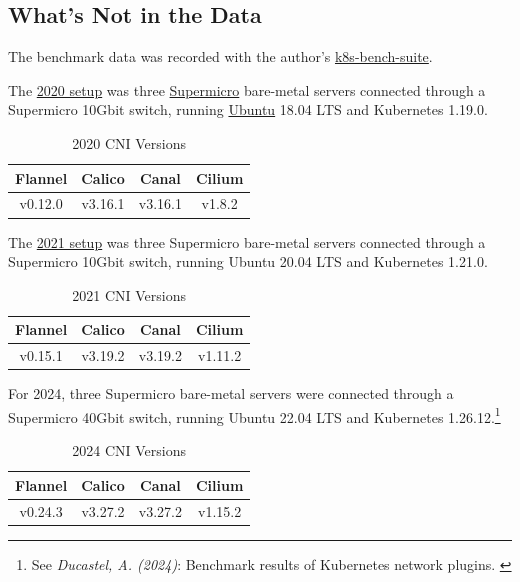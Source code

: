 \subsection{What's Not in the Data}

The benchmark data was recorded with the author's \href{https://github.com/InfraBuilder/k8s-bench-suite}{k8s-bench-suite}.

The \href{https://github.com/InfraBuilder/benchmark-k8s-cni-2020-08/blob/master/PROTOCOL.md}{2020 setup} was three \href{https://www.supermicro.com/en/}{Supermicro} bare-metal servers connected through a Supermicro 10Gbit switch, running \href{https://ubuntu.com/server}{Ubuntu} 18.04 LTS and Kubernetes 1.19.0.

\begin{table}[h!]
\caption{2020 CNI Versions}
\begin{tabular}{|c | c | c | c |} 
 \hline
 Flannel & Calico & Canal & Cilium \\
 \hline
 v0.12.0 & v3.16.1 & v3.16.1 & v1.8.2 \\ 
 \hline
\end{tabular}
\label{tab:2020ver}
\end{table}

The \href{https://github.com/InfraBuilder/benchmark-k8s-cni-2021-05/blob/main/PROTOCOL.md}{2021 setup} was three Supermicro bare-metal servers connected through a Supermicro 10Gbit switch, running Ubuntu 20.04 LTS and Kubernetes 1.21.0.

\begin{table}[h!]
\caption{2021 CNI Versions}
\begin{tabular}{|c | c | c | c |} 
 \hline
 Flannel & Calico & Canal & Cilium \\
 \hline
 v0.15.1 & v3.19.2 & v3.19.2 & v1.11.2 \\ 
 \hline
\end{tabular}
\label{tab:2021ver}
\end{table}

For 2024, three Supermicro bare-metal servers were connected through a Supermicro 40Gbit switch, running Ubuntu 22.04 LTS and Kubernetes 1.26.12.\footnote{See \textit{Ducastel, A. (2024)}: Benchmark results of Kubernetes network plugins. \cite{originalArticle}}

\begin{table}[h!]
\caption{2024 CNI Versions}
\begin{tabular}{|c | c | c | c |} 
 \hline
 Flannel & Calico & Canal & Cilium \\
 \hline
 v0.24.3 & v3.27.2 & v3.27.2 & v1.15.2 \\ 
 \hline
\end{tabular}
\label{tab:2024ver}
\end{table}

